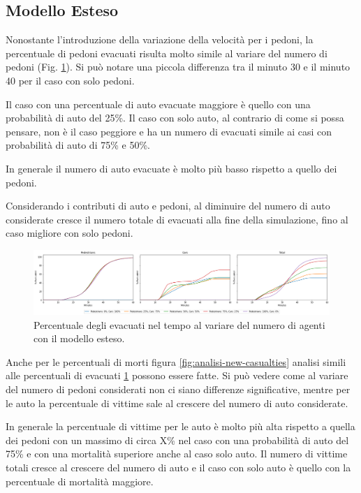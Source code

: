 \pagebreak

\subsection{Modello Esteso}
Nonostante l'introduzione della variazione della velocità per i pedoni,
la percentuale di pedoni evacuati risulta molto simile al variare del numero di pedoni (Fig. \ref{fig:analisi-new-evacuated}).
Si può notare una piccola differenza tra il minuto 30 e il minuto 40 per il caso con solo pedoni.

Il caso con una percentuale di auto evacuate maggiore è quello con una probabilità di auto del 25\%.
Il caso con solo auto, al contrario di come si possa pensare, non è il caso peggiore e ha un numero di evacuati simile ai casi
con probabilità di auto di 75\% e 50\%.

In generale il numero di auto evacuate è molto più basso rispetto a quello dei pedoni.

Considerando i contributi di auto e pedoni, al diminuire del numero di auto considerate cresce il numero totale di evacuati alla fine della simulazione,
fino al caso migliore con solo pedoni.

\begin{figure}[ht]
    \centering
    \includegraphics[width=\textwidth]{images/analisi/new-evacuated.png}
    \caption{Percentuale degli evacuati nel tempo al variare del numero di agenti con il modello esteso.}
    \label{fig:analisi-new-evacuated}
\end{figure}

Anche per le percentuali di morti figura \ref{fig:analisi-new-casualties} analisi simili alle percentuali di evacuati \ref*{fig:analisi-new-evacuated}
possono essere fatte.
%
Si può vedere come al variare del numero di pedoni considerati non ci siano differenze significative,
mentre per le auto la percentuale di vittime sale al crescere del numero di auto considerate.

In generale la percentuale di vittime per le auto è molto più alta rispetto a quella dei pedoni
con un massimo di circa X\% nel caso con una probabilità di auto del 75\% e con una mortalità superiore anche al caso solo auto.
%
Il numero di vittime totali cresce al crescere del numero di auto e il caso con solo auto è quello con la percentuale di mortalità maggiore.

